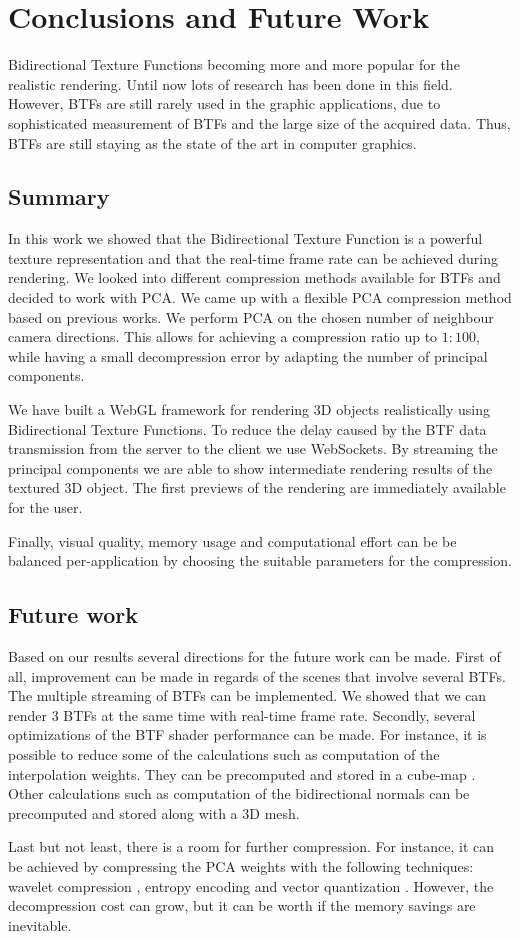 \chapter{Conclusions and Future Work}
\label{chapter:conclusions}
 Bidirectional Texture Functions becoming more and more popular for the realistic rendering.
Until now lots of research has been done in this field. 
However, BTFs are still rarely used in the graphic applications, 
due to  sophisticated measurement of BTFs and the large size of the acquired data.
Thus, BTFs are still staying as the state of the art in computer graphics. 


\section{Summary}
In this work we showed that the Bidirectional Texture Function is a powerful texture representation and 
that the real-time frame rate can be achieved during rendering.
We looked into different compression methods available for BTFs and decided to work with PCA.
We came up with a flexible PCA compression method based on previous works.
We perform PCA on the chosen number of neighbour camera directions.
This allows for achieving a compression ratio up to $1:100$, while having a small decompression error by adapting the number of principal components.

We have built a WebGL framework for rendering 3D objects realistically using Bidirectional Texture Functions.
To reduce the delay caused by the BTF data transmission from the server to the client we use WebSockets.
By streaming the principal components we are able to show intermediate rendering results of the textured 3D object.
The first previews of the rendering are immediately available for the user.

Finally, visual quality, memory usage and computational effort can be be balanced  per-application by choosing the suitable parameters for the compression.


\section{Future work}
\label{section:future_work}
Based on our results several directions for the future work can be made.
First of all, improvement can be made in regards of the scenes that involve several BTFs.
The multiple streaming of BTFs can be implemented. We showed that we can render 3 BTFs at the same time with real-time frame rate.
Secondly, several optimizations of the BTF shader performance can be made.
For instance, it is possible to reduce some of the calculations such as computation of the interpolation weights. 
They can be precomputed and stored in a cube-map \cite{haindl}.
Other calculations such as computation of the bidirectional normals can be precomputed and stored along with a 3D mesh.

Last but not least, there is a room for further compression.
 For instance, it can be achieved by compressing the PCA weights with the following techniques: wavelet compression \cite{webglbtfstreaming}, entropy encoding \cite{gpu_gems} and 
 vector quantization \cite{vectorquantization}.
However, the decompression cost can grow, but it can be worth if the memory savings are inevitable. 